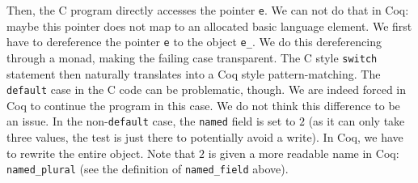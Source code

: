 \documentclass{article}
\newcommand\Coq{Coq}
\newcommand\Cn{C}
\begin{document}
Then, the \Cn{} program directly accesses the pointer \texttt{e}.
We can not do that in \Coq{}:
maybe this pointer does not map to an allocated basic language element.
We first have to dereference the pointer \texttt{e}
to the object \texttt{e_}.
We do this dereferencing through a monad,
making the failing case transparent.
The \Cn{} style \texttt{switch} statement then naturally translates
into a \Coq{} style pattern-matching.
The \texttt{default} case in the \Cn{} code can be problematic, though.
We are indeed forced in \Coq{} to continue the program in this case.
We do not think this difference to be an issue.
In the non-\texttt{default} case,
the \texttt{named} field is set to \(2\)
(as it can only take three values, the test is just there to potentially avoid a write).
In \Coq{}, we have to rewrite the entire object.
Note that \(2\) is given a more readable name in \Coq{}:
\texttt{named_plural}
(see the definition of \texttt{named_field} above).
\end{document}
